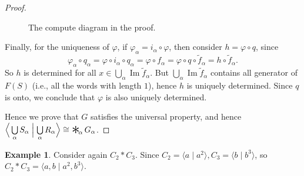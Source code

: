 \documentclass[a4paper,titlepage]{article}
\DeclareMathOperator{\Image}{Im}
\theoremstyle{remark}
\theoremstyle{definition}
\newtheorem{example}{Example}
\theoremstyle{definition}
\theoremstyle{plain}
\DeclareMathOperator*{\freeprod}{\raisebox{-0.4ex}{\scalebox{2}{$\ast$}}\!}
\begin{document}
\begin{proof}
\begin{figure}[h]
      \caption{The compute diagram in the proof.}
    \end{figure}

    Finally, for the uniqueness of $\varphi$, if $\varphi_\alpha = i_\alpha \circ \varphi$, 
    then consider $h = \varphi \circ q$, since
    \[ \varphi_\alpha \circ q_\alpha = \varphi \circ i_\alpha \circ q_\alpha
      = \varphi \circ f_\alpha = \varphi \circ q \circ \tilde{f}_\alpha = h \circ \tilde{f}_\alpha. \]
    So $h$ is determined for all $x \in \bigcup\limits_\alpha \Image{\tilde{f}_\alpha}$. But 
    $\bigcup\limits_\alpha \Image{\tilde{f}_\alpha}$ contains all generator of $F(S)$ (i.e., all the 
    words with length $1$), hence $h$ is uniquely determined. Since $q$ is onto, we conclude 
    that $\varphi$ is also uniquely determined.

    Hence we prove that $G$ satisfies the universal property, and hence 
    $ \Big\langle \bigcup\limits_\alpha S_\alpha \mathrel{\Big|} \bigcup\limits_\alpha R_\alpha \Big\rangle
    \cong \freeprod_\alpha G_\alpha $.
  \end{proof}

  \begin{example}
    Consider again $C_2 \ast C_3$. Since $C_2 = \langle a \mid a^2 \rangle, C_3 = \langle b \mid b^3 \rangle$,
    so $C_2 \ast C_3 = \langle a, b \mid a^2, b^3 \rangle$.
  \end{example}
\end{document}
